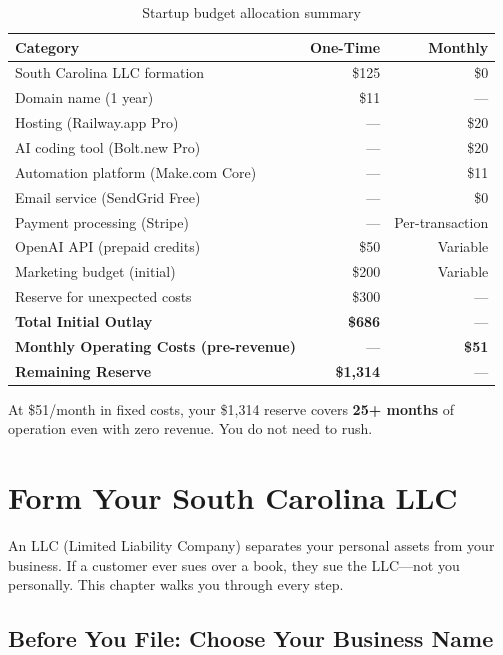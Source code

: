 \documentclass[12pt, letterpaper, oneside]{book}
\begin{document}
\begin{table}[H]
\centering
\begin{tabularx}{\textwidth}{Xrr}
\toprule
\textbf{Category} & \textbf{One-Time} & \textbf{Monthly} \\
\midrule
South Carolina LLC formation & \$125 & \$0 \\
Domain name (1 year) & \$11 & --- \\
Hosting (Railway.app Pro) & --- & \$20 \\
AI coding tool (Bolt.new Pro) & --- & \$20 \\
Automation platform (Make.com Core) & --- & \$11 \\
Email service (SendGrid Free) & --- & \$0 \\
Payment processing (Stripe) & --- & Per-transaction \\
OpenAI API (prepaid credits) & \$50 & Variable \\
Marketing budget (initial) & \$200 & Variable \\
Reserve for unexpected costs & \$300 & --- \\
\midrule
\textbf{Total Initial Outlay} & \textbf{\$686} & --- \\
\textbf{Monthly Operating Costs (pre-revenue)} & --- & \textbf{\$51} \\
\textbf{Remaining Reserve} & \textbf{\$1{,}314} & --- \\
\bottomrule
\end{tabularx}
\caption{Startup budget allocation summary}
\end{table}

\noindent At \$51/month in fixed costs, your \$1{,}314 reserve covers \textbf{25+ months} of operation even with zero revenue. You do not need to rush.

\chapter{Form Your South Carolina LLC}

An LLC (Limited Liability Company) separates your personal assets from your business. If a customer ever sues over a book, they sue the LLC---not you personally. This chapter walks you through every step.

\section{Before You File: Choose Your Business Name}
\end{document}
